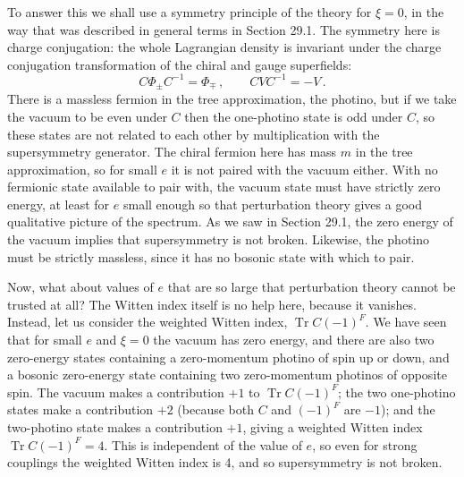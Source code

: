 To answer this we shall use a symmetry principle of the theory for
\(\xi=0\), in the way that was described in general terms in Section 29.1.
The symmetry here is charge conjugation: the whole Lagrangian density is
invariant under the charge conjugation transformation of the chiral and
gauge superfields:
\begin{equation}
  C\Phi_\pm C^{-1}=\Phi_\mp\,,
  \qquad
  CVC^{-1}=-V\,.
  \tag{29.4.1}\label{eq:29.4.1}
\end{equation}
There is a massless fermion in the tree approximation, the photino, but if
we take the vacuum to be even under \(C\) then the one-photino state is odd
under \(C\), so these states are not related to each other by multiplication
with the supersymmetry generator. The chiral fermion here has mass \(m\) in
the tree approximation, so for small \(e\) it is not paired with the vacuum
either. With no fermionic state available to pair with, the vacuum state must
have strictly zero energy, at least for \(e\) small enough so that
perturbation theory gives a good qualitative picture of the spectrum. As we
saw in Section 29.1, the zero energy of the vacuum implies that
supersymmetry is not broken. Likewise, the photino must be strictly
massless, since it has no bosonic state with which to pair.

Now, what about values of \(e\) that are so large that perturbation theory
cannot be trusted at all? The Witten index itself is no help here, because it
vanishes. Instead, let us consider the weighted Witten index,
\(\operatorname{Tr}C(-1)^F\). We have seen that for small \(e\) and
\(\xi=0\) the vacuum has zero energy, and there are also two zero-energy
states containing a zero-momentum photino of spin up or down, and a bosonic
zero-energy state containing two zero-momentum photinos of opposite spin.
The vacuum makes a contribution \(+1\) to \(\operatorname{Tr}C(-1)^F\);
the two one-photino states make a contribution \(+2\) (because both \(C\)
and \((-1)^F\) are \(-1\)); and the two-photino state makes a contribution
\(+1\), giving a weighted Witten index
\(\operatorname{Tr}C(-1)^F=4\). This is independent of the value of \(e\),
so even for strong couplings the weighted Witten index is 4, and so
supersymmetry is not broken.

